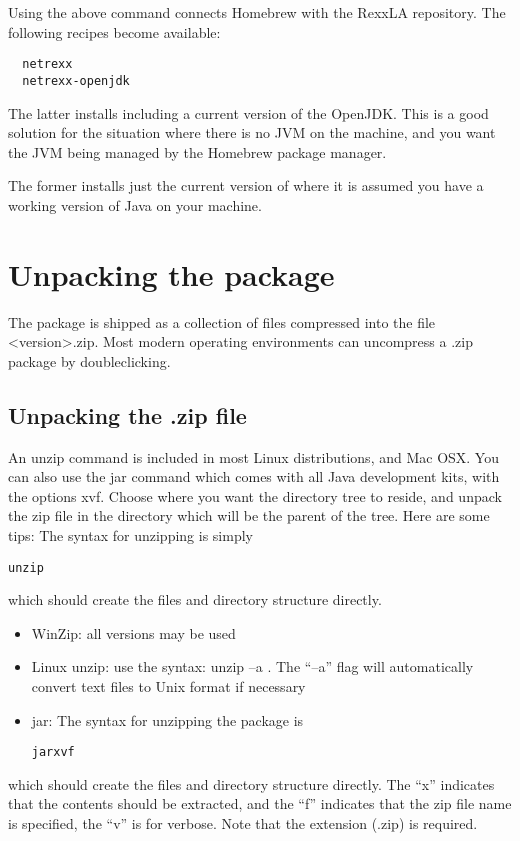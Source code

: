 Using the above  command connects Homebrew with the
RexxLA repository. The following recipes become available:

\begin{lstlisting}
  netrexx
  netrexx-openjdk
\end{lstlisting}

The latter installs \nr{} including a current version of the
OpenJDK. This is a good solution for the situation where there is no
JVM on the machine, and you want the JVM being managed by the Homebrew
package manager.

The former installs just the current version of \nr{} where it is
assumed you have a working version of Java on your machine.

\section{Unpacking the \nr{} package}
The \nr{} package is shipped as a collection of files compressed into the file \nr{}<version>.zip. 
Most modern operating environments can uncompress a .zip package by doubleclicking.
\subsection{Unpacking the \nr{}.zip file} 
An unzip command is included in most Linux distributions, and Mac
OSX. You can also use the jar command which comes with all Java
development kits, with the options xvf.
Choose where you want the \nr{} directory tree to reside, and unpack the zip file in the directory which will be the parent of the \nr{} tree. Here are some tips: 
The syntax for unzipping \nrpackagename{} is simply
\begin{alltt}
        unzip \nrpackagename{}
\end{alltt}
which should create the files and directory structure directly.
\begin{itemize} 
\item WinZip: all versions may be used
\item Linux unzip: use the syntax: unzip –a \code{\nrpackagename{}}. The “–a” flag will automatically convert text files to Unix format if necessary
\item jar: The syntax for unzipping the package is
\begin{alltt} 
jar xvf \nrpackagename{}
\end{alltt}
\end{itemize}
which should create the files and directory structure directly. The
“x” indicates that the contents should be extracted, and the “f”
indicates that the zip file name is specified, the ``v'' is for verbose. Note that the extension (.zip) is required. 

